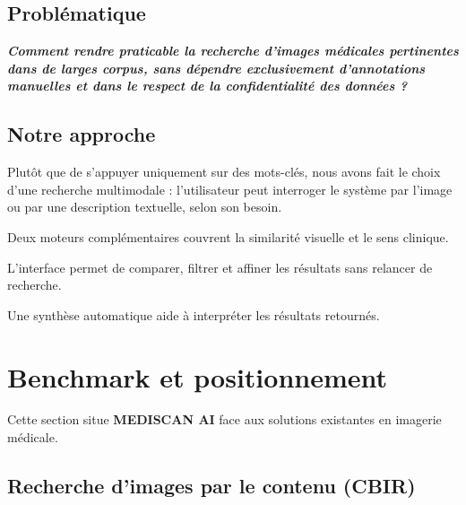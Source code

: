 \documentclass[12pt,a4paper]{article}
\newcommand{\NewMajorPart}{\clearpage}
\begin{document}
\vspace{0.5cm}

\subsection{Problématique}

\vspace{0.2cm}
\begin{tcolorbox}[colback=gray!8, colframe=gray!40, boxrule=0.4pt, arc=2pt]
\textbf{\textit{Comment rendre praticable la recherche d'images médicales pertinentes
dans de larges corpus, sans dépendre exclusivement d'annotations manuelles
et dans le respect de la confidentialité des données ?}}
\end{tcolorbox}

\vspace{0.5cm}

\subsection{Notre approche}

\vspace{0.2cm}
Plutôt que de s'appuyer uniquement sur des mots-clés, nous avons fait le choix
d'une recherche multimodale : l'utilisateur peut interroger le système par l'image
ou par une description textuelle, selon son besoin.

\vspace{0.2cm}
\begin{sq}
  \item Deux moteurs complémentaires couvrent la similarité visuelle et le sens clinique.
  \item L'interface permet de comparer, filtrer et affiner les résultats sans relancer de recherche.
  \item Une synthèse automatique aide à interpréter les résultats retournés.
\end{sq}


\NewMajorPart
\section{Benchmark et positionnement}

Cette section situe \textbf{MEDISCAN AI} face aux solutions existantes en imagerie médicale.

\subsection{Recherche d'images par le contenu (CBIR)}
\end{document}
